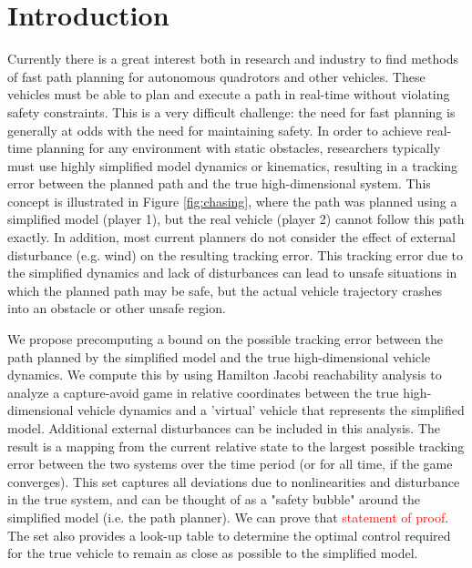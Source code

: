 \section{Introduction}
 Currently there is a great interest both in research and industry to find methods of fast path planning for autonomous quadrotors and other vehicles. These vehicles must be able to plan and execute a path in real-time without violating safety constraints. This is a very difficult challenge: the need for fast planning is generally at odds with the need for maintaining safety. In order to achieve real-time planning for any environment with static obstacles, researchers typically must use highly simplified model dynamics or kinematics, resulting in a tracking error between the planned path and the true high-dimensional system. This concept is illustrated in Figure \ref{fig:chasing}, where the path was planned using a simplified model (player 1), but the real vehicle (player 2) cannot follow this path exactly. In addition, most current planners do not consider the effect of external disturbance (e.g. wind) on the resulting tracking error. This tracking error due to the simplified dynamics and lack of disturbances can lead to unsafe situations in which the planned path may be safe, but the actual vehicle trajectory crashes into an obstacle or other unsafe region.

We propose precomputing a bound on the possible tracking error between the path planned by the simplified model and the true high-dimensional vehicle dynamics. We compute this by using Hamilton Jacobi reachability analysis to analyze a capture-avoid game in relative coordinates between the true high-dimensional vehicle dynamics and a 'virtual' vehicle that represents the simplified model. Additional external disturbances can be included in this analysis. The result is a mapping from the current relative state to the largest possible tracking error between the two systems over the time period (or for all time, if the game converges). This set captures all deviations due to nonlinearities and disturbance in the true system, and can be thought of as a "safety bubble" around the simplified model (i.e. the path planner). We can prove that \textcolor{red}{statement of proof}. The set also provides a look-up table to determine the optimal control required for the true vehicle to remain as close as possible to the simplified model.

